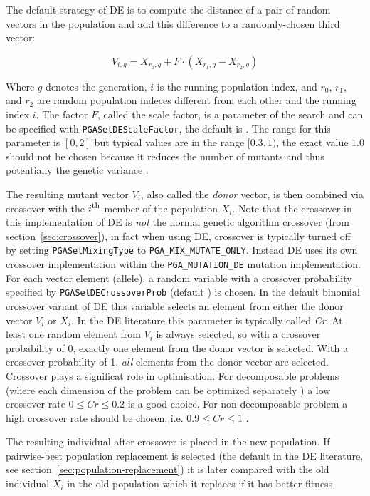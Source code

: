 \documentclass{report}
\begin{document}
The default strategy of DE is to compute the distance of a pair of
random vectors in the population and add this difference to a
randomly-chosen third vector:

\begin{equation}\label{de/rand/1}
V_{i,g} = X_{r_0,g} + F \cdot (X_{r_1,g} - X_{r_2,g})
\end{equation}

Where $g$ denotes the generation, $i$ is the running population
index, and $r_0$, $r_1$, and $r_2$ are random population indeces
different from each other and the running index $i$. The factor $F$,
called the scale factor, is a parameter of the search and can be
specified with \verb+PGASetDEScaleFactor+, the default is
\DefaultDEScaleFactor. The range for this parameter is $[0,2]$ but
typical values are in the range $[0.3,1)$, the exact
value $1.0$ should not be chosen because it reduces the number of
mutants and thus potentially the genetic variance \cite[p.~75]{PSL05}.

The resulting
mutant vector $V_i$, also called the \textit{donor} vector, is then
combined via crossover with the $i^{\hbox{\footnotesize th}}$ member of
the population $X_i$. Note that the crossover in this implementation of DE is
\textit{not} the normal genetic algorithm crossover (from
section~\ref{sec:crossover}), in fact when using DE, crossover is
typically turned off by setting \verb+PGASetMixingType+ to
\verb+PGA_MIX_MUTATE_ONLY+. Instead DE uses its own crossover implementation
within the \verb+PGA_MUTATION_DE+ mutation implementation. For each
vector element (allele), a random variable with a crossover probability
specified by \verb+PGASetDECrossoverProb+ (default \DefaultDECrossoverProb)
is chosen. In the default binomial crossover variant of DE this variable
selects an element from either the donor vector $V_i$ or $X_i$. In the
DE literature this parameter is typically called \textit{Cr}. At least
one random element from $V_i$ is always selected, so with a crossover
probability of 0, exactly one element from the donor vector is selected.
With a crossover probability of 1, \textit{all} elements from the donor
vector are selected. Crossover plays a significat role in optimisation.
For decomposable problems (where each dimension of the problem can be
optimized separately \cite{Sal96}) a low crossover rate $0 \le Cr \le
0.2$ is a good choice. For non-decomposable problem a high crossover
rate should be chosen, i.e. $0.9 \le Cr \le 1$ \cite[p.~98]{PSL05}.

The resulting individual after crossover is placed in the
new population. If pairwise-best population replacement is selected (the
default in the DE literature, see section~\ref{sec:population-replacement})
it is later compared with the old individual $X_i$ in the old population
which it replaces if it has better fitness.
\end{document}
